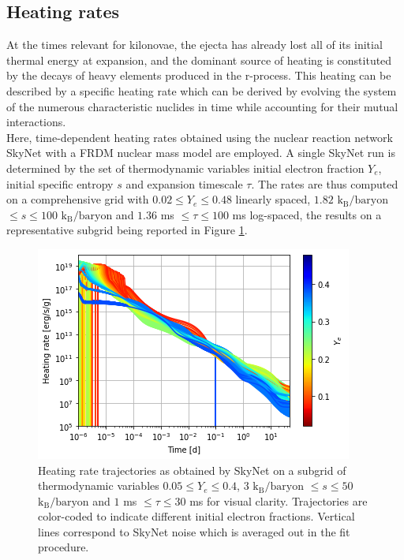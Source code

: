 \documentclass[fleqn,usenatbib]{mnras}
\begin{document}
    \subsection{Heating rates}
    At the times relevant for kilonovae, the ejecta has already lost all of its initial thermal energy at expansion, and the dominant source of heating is constituted by the decays of heavy elements produced in the r-process. This heating can be described by a specific heating rate which can be derived by evolving the system of the numerous characteristic nuclides in time while accounting for their mutual interactions.\\
    Here, time-dependent heating rates obtained using the nuclear reaction network SkyNet with a FRDM nuclear mass model are employed. A single SkyNet run is determined by the set of thermodynamic variables initial electron fraction $Y_e$, initial specific entropy $s$ and expansion timescale $\tau$. The rates are thus computed on a comprehensive grid with $0.02\leq Y_e\leq0.48$ linearly spaced, $1.82$ $\mathrm{k_B/baryon}$ $\leq s\leq100$ $\mathrm{k_B/baryon}$ and $1.36$ ms $\leq\tau\leq100$ ms log-spaced, the results on a representative subgrid being reported in Figure \ref{heatrates}.\\
    \begin{figure}
    \centering
    \includegraphics[scale=0.6]{figures/heating/heating rate fits/heatrates.png}
    \caption{Heating rate trajectories as obtained by SkyNet on a subgrid of thermodynamic variables $0.05\leq Y_e\leq0.4$, $3$ $\mathrm{k_B/baryon}$ $\leq s\leq50$ $\mathrm{k_B/baryon}$ and $1$ ms $\leq\tau\leq30$ ms for visual clarity. Trajectories are color-coded to indicate different initial electron fractions. Vertical lines correspond to SkyNet noise which is averaged out in the fit procedure.}
    \label{heatrates}
    \end{figure}
\end{document}
